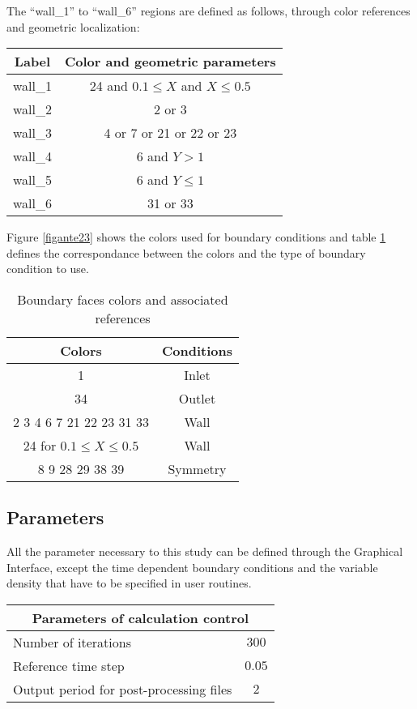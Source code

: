 The ``wall\_1'' to ``wall\_6'' regions are defined as follows, through color
references and geometric localization:
\begin{center}
\begin{tabular}{c|c}
Label & Color and geometric parameters \\
\hline
wall\_1 & 24 and $0.1\leqslant X$ and $X\leqslant 0.5$ \\
wall\_2 & 2 or 3 \\
wall\_3 & 4 or 7 or 21 or 22 or 23 \\
wall\_4 & 6 and $Y>1$ \\
wall\_5 & 6 and $Y\leqslant1$ \\
wall\_6 & 31 or 33 \\
\end{tabular}
\end{center}

Figure \ref{figante23} shows the colors used for boundary conditions and
table \ref{tabante31} defines the correspondance between the colors and
the type of boundary condition to use.

\begin{table}[htp]
\begin{center}
\begin{tabular}{|c|c|}
\hline
Colors & Conditions \\
\hline
1 & Inlet \\
\hline
34 & Outlet \\
\hline
2 3 4 6 7 21 22 23 31 33 & Wall \\
\hline
24 for $0.1 \leq X \leq 0.5$ & Wall \\
\hline
8 9 28 29 38 39 & Symmetry \\
\hline
\end{tabular}
\caption{Boundary faces colors and associated references}
\label{tabante31}
\end{center}
\end{table}


        \subsection{Parameters}

All the parameter necessary to this study can be defined through the Graphical
Interface, except the time dependent boundary conditions and the variable
density that have to be specified in user routines.

\begin{center}
\begin{tabular}{|l|c|}
\hline
\multicolumn{2}{|c|}{Parameters of calculation control} \\
\hline
Number of iterations & $300$ \\
\hline
Reference time step & $0.05$ \\
\hline
Output period for post-processing files& $2$ \\
\hline
\end{tabular}\\
\end{center}

